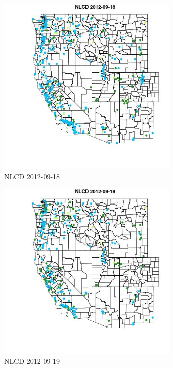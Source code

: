 \begin{figure} 
\centering  
\includegraphics[width=0.77\textwidth]{Code_Outputs/ML_input_report_ML_input_PM25_Step5_part_d_de_duplicated_aves_ML_input_MapObsNLCD2012-09-18.jpg} 
\caption{\label{fig:ML_input_report_ML_input_PM25_Step5_part_d_de_duplicated_aves_ML_inputMapObsNLCD2012-09-18}NLCD 2012-09-18} 
\end{figure} 
 

\begin{figure} 
\centering  
\includegraphics[width=0.77\textwidth]{Code_Outputs/ML_input_report_ML_input_PM25_Step5_part_d_de_duplicated_aves_ML_input_MapObsNLCD2012-09-19.jpg} 
\caption{\label{fig:ML_input_report_ML_input_PM25_Step5_part_d_de_duplicated_aves_ML_inputMapObsNLCD2012-09-19}NLCD 2012-09-19} 
\end{figure} 
 

